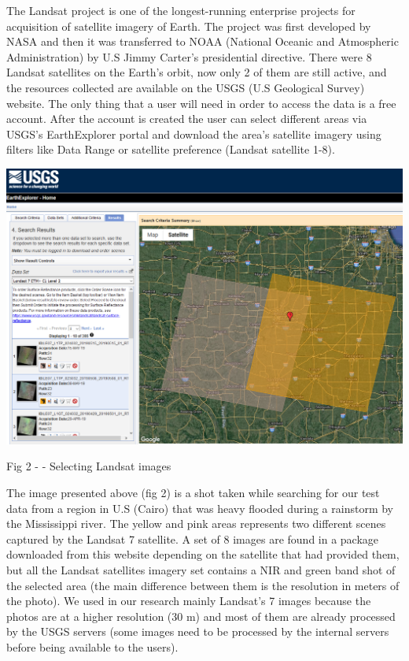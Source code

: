 \documentclass[12pt, a4paper]{report}
\begin{document}
\par 
The Landsat project is one of the longest-running enterprise projects for acquisition of satellite imagery of Earth. The project was first developed by NASA and then it was transferred to NOAA (National Oceanic and Atmospheric Administration) by U.S Jimmy Carter's presidential directive. There were 8 Landsat satellites on the Earth's orbit, now only 2 of them are still active, and the resources collected are available on the USGS (U.S Geological Survey) website. The only thing that a user will need in order to access the data is a free account. After the account is created the user can select different areas via USGS's EarthExplorer portal and download the area's satellite imagery using filters like Data Range or satellite preference (Landsat satellite 1-8).
\par

\bigskip

\includegraphics[scale=0.5, right]{landsat_search.png} 
\begin{center}
Fig 2 - \cite{USGS} - Selecting Landsat images
\end{center}

The image presented above (fig 2) is a shot taken while searching for our test data from a region in U.S (Cairo) that was heavy flooded during a rainstorm by the Mississippi river. The yellow and pink areas represents two different scenes captured by the Landsat 7 satellite. A set of 8 images are found in a package downloaded from this website depending on the satellite that had provided them, but all the Landsat satellites imagery set contains a NIR and green band shot of the selected area (the main difference between them is the resolution in meters of the photo). We used in our research mainly Landsat's 7 images because the photos are at a higher resolution (30 m) and most of them are already processed by the USGS servers (some images need to be processed by the internal servers before being available to the users).
\end{document}
